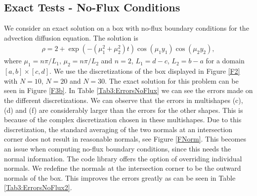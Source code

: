 \documentclass[11pt, a4paper]{article}
\theoremstyle{definition}
\begin{document}
\subsection{Exact Tests - No-Flux Conditions}
We consider an exact solution on a box with no-flux boundary conditions for the advection diffusion equation. The solution is
\begin{align*}
	 \rho = 2 + \exp(-(\mu_1^2 + \mu_2^2)t)\cos(\mu_1 y_1)\cos(\mu_2 y_2),
\end{align*}
where $	\mu_1 = n\pi/L_1$, $\mu_2 = n\pi/L_2$ and $n = 2$, $L_1 = d - c$, $ L_2 = b - a$ for a domain $ [a,b]\times [c,d]$. We use the discretizations of the box displayed in Figure \ref{F2} with $N = 10$, $N= 20$ and $N = 30$. The exact solution for this problem can be seen in Figure \ref{F3b}. In Table \ref{Tab3:ErrorsNoFlux} we can see the errors made on the different discretizations. We can observe that the errors in multishapes (c), (d) and (f) are considerably larger than the errors for the other shapes. This is because of the complex discretization chosen in these multishapes. Due to this discretization, the standard averaging of the two normals at an intersection corner does not result in reasonable normals, see Figure \ref{FNorm}. This becomes an issue when computing no-flux boundary conditions, since this needs the normal information. The code library offers the option of overriding individual normals. We redefine the normals at the intersection corner to be the outward normals of the box. This improves the errors greatly as can be seen in Table \ref{Tab3:ErrorsNoFlux2}.
\end{document}
